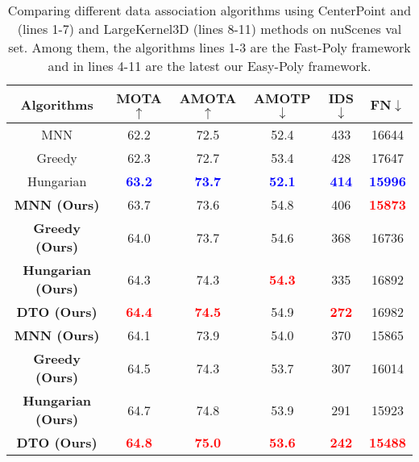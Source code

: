 \begin{table}
        \caption{Comparing different data association algorithms using CenterPoint and (lines 1-7) and LargeKernel3D (lines 8-11) methods on nuScenes val set. Among them, the algorithms lines 1-3 are the Fast-Poly framework and in lines 4-11 are the latest our Easy-Poly framework.}

        \label{table:nus_assoc}
        \setlength{\tabcolsep}{0.1mm}
        \begin{tabular}{cccccc}
        \toprule
        \multicolumn{1}{c}{\textbf{Algorithms}} & \textbf{MOTA}$\uparrow$ & \textbf{AMOTA}$\uparrow$ & \textbf{AMOTP}$\downarrow$ & \textbf{IDS}$\downarrow$ & \textbf{FN}$\downarrow$\\ 
        
        \midrule
         MNN  & 62.2  & 72.5 & 52.4  & 433 & 16644  \\  
         Greedy    & 62.3  & 72.7 &  53.4  & 428  & 17647 \\
         Hungarian & \textbf{\textcolor{blue}{63.2}}  & \textbf{\textcolor{blue}{73.7}} & \textbf{\textcolor{blue}{52.1}} & \textbf{\textcolor{blue}{414}}  & \textbf{\textcolor{blue}{15996}}  \\
        
        \midrule  
        \textbf{MNN (Ours)}  & 63.7  & 73.6 & 54.8  & 406 &  \textbf{\textcolor{red}{15873 }}\\  
        \textbf{Greedy (Ours)}    &  64.0  & 73.7  &  54.6  & 368  & 16736 \\
        \textbf{Hungarian (Ours)}  & 64.3  & 74.3 & \textbf{\textcolor{red}{54.3}} &  335 & 16892  \\

        \textbf{DTO (Ours)}   & \textbf{\textcolor{red}{64.4}}  &   \textbf{\textcolor{red}{74.5}} & 54.9 &  \textbf{\textcolor{red}{272}} & 16982  \\

        
         \midrule
         \textbf{MNN (Ours)}  & 64.1  & 73.9 & 54.0  & 370 & 15865  \\  
         \textbf{Greedy (Ours)}    & 64.5  & 74.3 & 53.7  & 307  & 16014 \\
        \textbf{Hungarian (Ours)}  & 64.7  & 74.8 & 53.9  & 291  & 15923 \\

        \textbf{DTO (Ours)}  & \textbf{\textcolor{red}{64.8}}  & \textbf{\textcolor{red}{75.0}} & \textbf{\textcolor{red}{53.6}}  & \textbf{\textcolor{red}{242}}  & \textbf{\textcolor{red}{15488}} \\

    \bottomrule
\end{tabular}
\end{table}



